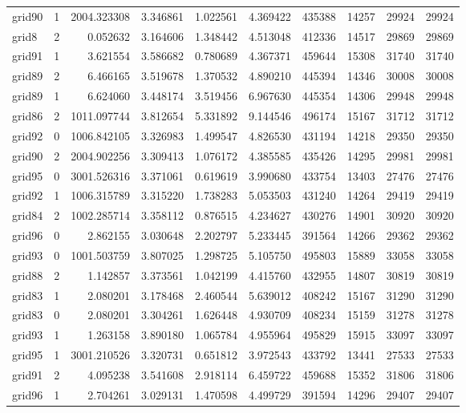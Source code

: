\begin{longtable}{|l|r|r|r|r|r|r|r|r|r|}
grid90 & 1 & 2004.323308 & 3.346861 & 1.022561 & 4.369422 & 435388 & 14257 & 29924 & 29924 \\
grid8 & 2 & 0.052632 & 3.164606 & 1.348442 & 4.513048 & 412336 & 14517 & 29869 & 29869 \\
grid91 & 1 & 3.621554 & 3.586682 & 0.780689 & 4.367371 & 459644 & 15308 & 31740 & 31740 \\
grid89 & 2 & 6.466165 & 3.519678 & 1.370532 & 4.890210 & 445394 & 14346 & 30008 & 30008 \\
grid89 & 1 & 6.624060 & 3.448174 & 3.519456 & 6.967630 & 445354 & 14306 & 29948 & 29948 \\
grid86 & 2 & 1011.097744 & 3.812654 & 5.331892 & 9.144546 & 496174 & 15167 & 31712 & 31712 \\
grid92 & 0 & 1006.842105 & 3.326983 & 1.499547 & 4.826530 & 431194 & 14218 & 29350 & 29350 \\
grid90 & 2 & 2004.902256 & 3.309413 & 1.076172 & 4.385585 & 435426 & 14295 & 29981 & 29981 \\
grid95 & 0 & 3001.526316 & 3.371061 & 0.619619 & 3.990680 & 433754 & 13403 & 27476 & 27476 \\
grid92 & 1 & 1006.315789 & 3.315220 & 1.738283 & 5.053503 & 431240 & 14264 & 29419 & 29419 \\
grid84 & 2 & 1002.285714 & 3.358112 & 0.876515 & 4.234627 & 430276 & 14901 & 30920 & 30920 \\
grid96 & 0 & 2.862155 & 3.030648 & 2.202797 & 5.233445 & 391564 & 14266 & 29362 & 29362 \\
grid93 & 0 & 1001.503759 & 3.807025 & 1.298725 & 5.105750 & 495803 & 15889 & 33058 & 33058 \\
grid88 & 2 & 1.142857 & 3.373561 & 1.042199 & 4.415760 & 432955 & 14807 & 30819 & 30819 \\
grid83 & 1 & 2.080201 & 3.178468 & 2.460544 & 5.639012 & 408242 & 15167 & 31290 & 31290 \\
grid83 & 0 & 2.080201 & 3.304261 & 1.626448 & 4.930709 & 408234 & 15159 & 31278 & 31278 \\
grid93 & 1 & 1.263158 & 3.890180 & 1.065784 & 4.955964 & 495829 & 15915 & 33097 & 33097 \\
grid95 & 1 & 3001.210526 & 3.320731 & 0.651812 & 3.972543 & 433792 & 13441 & 27533 & 27533 \\
grid91 & 2 & 4.095238 & 3.541608 & 2.918114 & 6.459722 & 459688 & 15352 & 31806 & 31806 \\
grid96 & 1 & 2.704261 & 3.029131 & 1.470598 & 4.499729 & 391594 & 14296 & 29407 & 29407 \\

\end{longtable}
